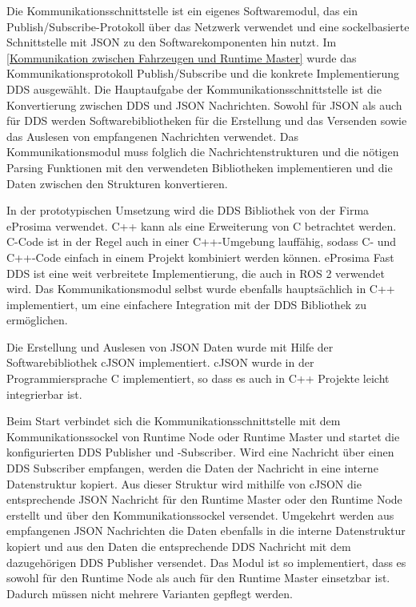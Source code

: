 Die Kommunikationsschnittstelle ist ein eigenes Softwaremodul, das ein Publish/Subscribe-Protokoll über das Netzwerk verwendet und eine sockelbasierte Schnittstelle mit JSON zu den Softwarekomponenten hin nutzt. Im \autoref{Kommunikation zwischen Fahrzeugen und Runtime Master} wurde das Kommunikationsprotokoll Publish/Subscribe und die konkrete Implementierung \gls{DDS} ausgewählt. Die Hauptaufgabe der Kommunikationsschnittstelle ist die Konvertierung zwischen \gls{DDS} und \gls{JSON} Nachrichten. Sowohl für \gls{JSON} als auch für \gls{DDS} werden Softwarebibliotheken für die Erstellung und das Versenden sowie das Auslesen von empfangenen Nachrichten verwendet. Das Kommunikationsmodul muss folglich die Nachrichtenstrukturen und die nötigen Parsing Funktionen mit den verwendeten Bibliotheken implementieren und die Daten zwischen den Strukturen konvertieren. 

In der prototypischen Umsetzung wird die \gls{DDS} Bibliothek von der Firma eProsima verwendet. C++ kann als eine Erweiterung von C betrachtet werden. C-Code ist in der Regel auch in einer C++-Umgebung lauffähig, sodass C- und C++-Code einfach in einem Projekt kombiniert werden können. eProsima Fast DDS ist eine weit verbreitete Implementierung, die auch in \gls{ROS} 2 verwendet wird. Das Kommunikationsmodul selbst wurde ebenfalls hauptsächlich in C++ implementiert, um eine einfachere Integration mit der \gls{DDS} Bibliothek zu ermöglichen. 

Die Erstellung und Auslesen von \gls{JSON} Daten wurde mit Hilfe der Softwarebibliothek cJSON implementiert. cJSON wurde in der Programmiersprache C implementiert, so dass es auch in C++ Projekte leicht integrierbar ist. 

Beim Start verbindet sich die Kommunikationsschnittstelle mit dem Kommunikationssockel von Runtime Node oder Runtime Master und startet die konfigurierten \gls{DDS} Publisher und -Subscriber. Wird eine Nachricht über einen \gls{DDS} Subscriber empfangen, werden die Daten der Nachricht in eine interne Datenstruktur kopiert. Aus dieser Struktur wird mithilfe von cJSON die entsprechende \gls{JSON} Nachricht für den Runtime Master oder den Runtime Node erstellt und über den Kommunikationssockel versendet. Umgekehrt werden aus empfangenen \gls{JSON} Nachrichten die Daten ebenfalls in die interne Datenstruktur kopiert und aus den Daten die entsprechende \gls{DDS} Nachricht mit dem dazugehörigen \gls{DDS} Publisher versendet. Das Modul ist so implementiert, dass es sowohl für den Runtime Node als auch für den Runtime Master einsetzbar ist. Dadurch müssen nicht mehrere Varianten gepflegt werden.

